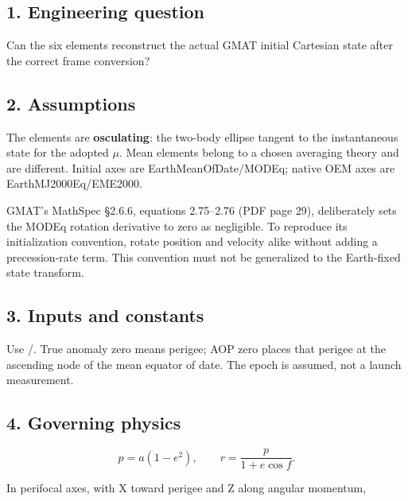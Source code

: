 \documentclass[10pt,a4paper]{article}
\numberwithin{equation}{section}
\begin{document}
\subsection*{1. Engineering question}
\begin{sloppypar}Can the six elements reconstruct the actual GMAT initial Cartesian state after the correct frame conversion?\end{sloppypar}


\subsection*{2. Assumptions}
\begin{sloppypar}The elements are \textbf{osculating}: the two-body ellipse tangent to the instantaneous state for the adopted \(\mu\). Mean elements belong to a chosen averaging theory and are different. Initial axes are EarthMeanOfDate/MODEq; native OEM axes are EarthMJ2000Eq/EME2000.\end{sloppypar}


\begin{sloppypar}GMAT's MathSpec §2.6.6, equations 2.75--2.76 (PDF page 29), deliberately sets the MODEq rotation derivative to zero as negligible. To reproduce its initialization convention, rotate position and velocity alike without adding a precession-rate term. This convention must not be generalized to the Earth-fixed state transform.\end{sloppypar}


\subsection*{3. Inputs and constants}
\begin{sloppypar}Use \cite{S01}/\cite{S02}. True anomaly zero means perigee; AOP zero places that perigee at the ascending node of the mean equator of date. The epoch is assumed, not a launch measurement.\end{sloppypar}


\subsection*{4. Governing physics}

\begin{equation}p=a(1-e^2),\qquad r=\frac{p}{1+e\cos f}.\label{eq:ch1-1}\end{equation}

\begin{sloppypar}In perifocal axes, with X toward perigee and Z along angular momentum,\end{sloppypar}
\end{document}
